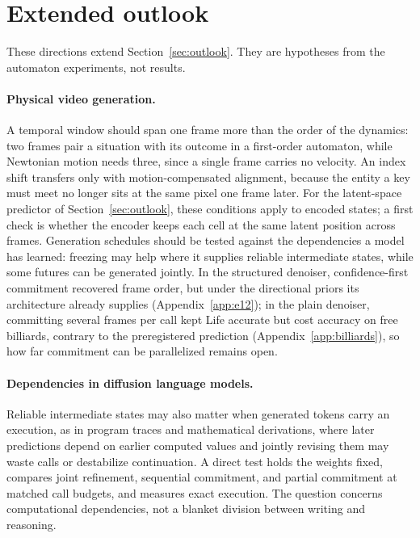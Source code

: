 \documentclass[11pt]{article}
\begin{document}
\section{Extended outlook}
\label{app:outlook}

These directions extend Section~\ref{sec:outlook}. They are hypotheses from the automaton experiments, not results.

\paragraph{Physical video generation.}
A temporal window should span one frame more than the order of the dynamics: two frames pair a situation with its outcome in a first-order automaton, while Newtonian motion needs three, since a single frame carries no velocity. An index shift transfers only with motion-compensated alignment, because the entity a key must meet no longer sits at the same pixel one frame later. For the latent-space predictor of Section~\ref{sec:outlook}, these conditions apply to encoded states; a first check is whether the encoder keeps each cell at the same latent position across frames. Generation schedules should be tested against the dependencies a model has learned: freezing may help where it supplies reliable intermediate states, while some futures can be generated jointly. In the structured denoiser, confidence-first commitment recovered frame order, but under the directional priors its architecture already supplies (Appendix~\ref{app:e12}); in the plain denoiser, committing several frames per call kept Life accurate but cost accuracy on free billiards, contrary to the preregistered prediction (Appendix~\ref{app:billiards}), so how far commitment can be parallelized remains open.

\paragraph{Dependencies in diffusion language models.}
Reliable intermediate states may also matter when generated tokens carry an execution, as in program traces and mathematical derivations, where later predictions depend on earlier computed values and jointly revising them may waste calls or destabilize continuation. A direct test holds the weights fixed, compares joint refinement, sequential commitment, and partial commitment at matched call budgets, and measures exact execution. The question concerns computational dependencies, not a blanket division between writing and reasoning.
\end{document}
